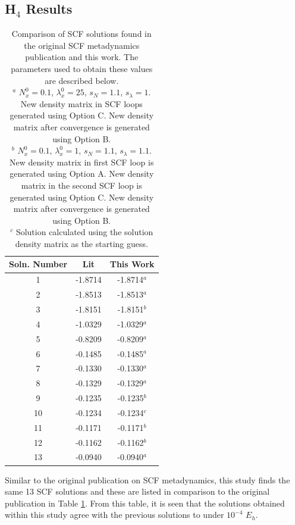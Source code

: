 \documentclass[final,3p,times,twocolumn]{elsarticle}
\begin{document}
\subsection{H$_4$ Results} \label{sec:h4results}
\begin{table}
\centering
\begin{tabular}{c|cc} \hline\hline
Soln. Number & Lit\cite{scfmd} & This Work \\ \hline
1 & -1.8714 & -1.8714$^a$ \\
2 & -1.8513 & -1.8513$^a$ \\
3 & -1.8151 & -1.8151$^b$ \\
4 & -1.0329 & -1.0329$^a$ \\
5 & -0.8209 & -0.8209$^a$ \\
6 & -0.1485 & -0.1485$^a$ \\
7 & -0.1330 & -0.1330$^a$ \\
8 & -0.1329 & -0.1329$^a$ \\
9 & -0.1235 & -0.1235$^b$ \\
10 & -0.1234 & -0.1234$^c$ \\
11 & -0.1171 & -0.1171$^b$ \\
12 & -0.1162 & -0.1162$^b$ \\
13 & -0.0940 & -0.0940$^a$ \\ \hline\hline
\end{tabular}
\caption{Comparison of SCF solutions found in the original SCF metadynamics publication\cite{scfmd} and this work. The parameters used to obtain these values are described below.\\
$^a$ $N_x^0 = 0.1$, $\lambda_x^0 = 25$, $s_N = 1.1$, $s_\lambda = 1$. New density matrix in SCF loops generated using Option C. New density matrix after convergence is generated using Option B.\\
$^b$ $N_x^0 = 0.1$, $\lambda_x^0 = 1$, $s_N = 1.1$, $s_\lambda = 1.1$. New density matrix in first SCF loop is generated using Option A. New density matrix in the second SCF loop is generated using Option C. New density matrix after convergence is generated using Option B.\\
$^c$ Solution calculated using the solution density matrix as the starting guess.}
\label{tab:h4results}
\end{table}

Similar to the original publication on SCF metadynamics,\cite{scfmd} this study finds the same 13 SCF solutions and these are listed in comparison to the original publication in Table \ref{tab:h4results}. From this table, it is seen that the solutions obtained within this study agree with the previous solutions to under $10^{-4}$ $E_h$. 
\end{document}
